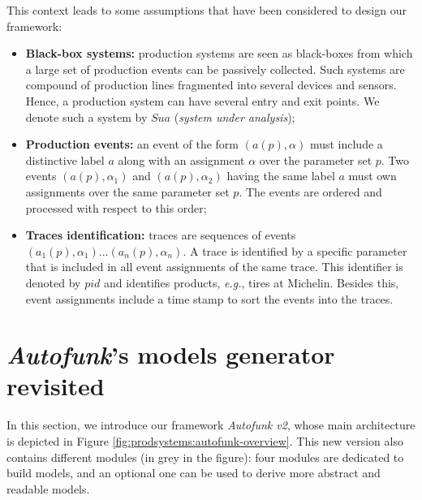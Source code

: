 This context leads to some assumptions that have been considered
to design our framework:

\begin{itemize}
    \item \textbf{Black-box systems:} production systems are seen as
        black-boxes from which a large set of production events can
        be passively collected. Such systems are compound of
        production lines fragmented into several devices and sensors.
        Hence, a production system can have several entry and exit
        points. We denote such a system by $\mathit{Sua}$ (\emph{system
        under analysis});

    \item \textbf{Production events:} an event of the form
        $(a(p), \alpha)$ must include a distinctive label $a$
        along with an assignment $\alpha$ over the parameter set
        $p$. Two events $(a(p), \alpha_1)$ and $(a(p), \alpha_2)$
        having the same label $a$ must own assignments over the
        same parameter set $p$. The events are ordered and
        processed with respect to this order;

    \item \textbf{Traces identification:} traces are sequences of
        events $(a_1(p), \alpha_1) \dots  (a_n(p), \alpha_n)$. A
        trace is identified by a specific parameter that is
        included in all event assignments of the same trace. This
        identifier is denoted by $pid$ and identifies products,
        \emph{e.g.}, tires at Michelin.  Besides this, event
        assignments include a time stamp to sort the events into
        the traces.
\end{itemize}


\section{\textit{Autofunk}'s models generator revisited}
\label{sec:modelinf:prodsystems:autofunk}

In this section, we introduce our framework \textit{Autofunk v2},
whose main architecture is depicted in Figure
\ref{fig:prodsystems:autofunk-overview}. This new version also
contains different modules (in grey in the figure): four modules
are dedicated to build models, and an optional one can be used to
derive more abstract and readable models.

